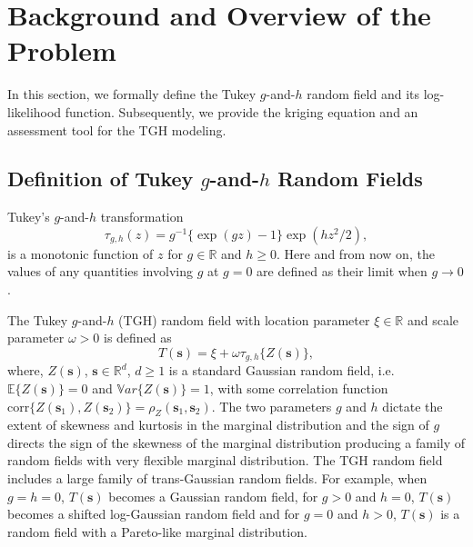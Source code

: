 \documentclass[conference]{IEEEtran}
\begin{document}
%


\section{Background and Overview of the Problem}
In this section, we formally define the Tukey $g$-and-$h$ random field and its log-likelihood function. Subsequently, we provide the kriging equation and an assessment tool for the TGH modeling.
\subsection{Definition of Tukey $g$-and-$h$ Random Fields}
Tukey's $g$-and-$h$ transformation
\begin{equation}\label{eq:TGH_transformation}
\tau_{g,h}(z) = g^{-1} \{ \exp(gz)-1 \} \exp(h z^2/2),
\end{equation}
is a monotonic function of $z$ for $g \in \mathbb{R}$ and $h \geq 0$. Here and from now on, the values of any quantities involving $g$ at $g = 0$ are defined as their limit when $g \rightarrow 0$.

The Tukey $g$-and-$h$ (TGH) random field with location parameter $\xi \in \mathbb{R}$ and scale parameter $\omega > 0$ is defined as 
\begin{equation}\label{eq:TGH_random_field}
T(\bm s) = \xi + \omega \tau_{g,h}\{Z(\bm s)\},
\end{equation}
where, $Z(\bm s)$, $\bm s \in \mathbb{R}^d$, $d \geq 1$ is a standard Gaussian random field, i.e. $\mathbb{E}\{Z(\bm s)\} = 0$ and $\mathbb{V}ar\{Z(\bm s)\} = 1$, with some correlation function $\text{corr}\{Z(\bm s_1),Z(\bm s_2)\} = \rho_Z(\bm s_1,\bm s_2)$. The two parameters $g$ and $h$ dictate the extent of skewness and kurtosis in the marginal distribution and the sign of $g$ directs the sign of the skewness of the marginal distribution producing a family of random fields with very flexible marginal distribution. The TGH random field includes a large family of trans-Gaussian random fields. For example, when $g=h=0$, $T(\bm s)$ becomes a Gaussian random field, for $g>0$ and $h=0$, $T(\bm s)$ becomes a shifted log-Gaussian random field and for $g = 0$ and $h>0$, $T(\bm s)$ is a random field with a Pareto-like marginal distribution.
\end{document}
